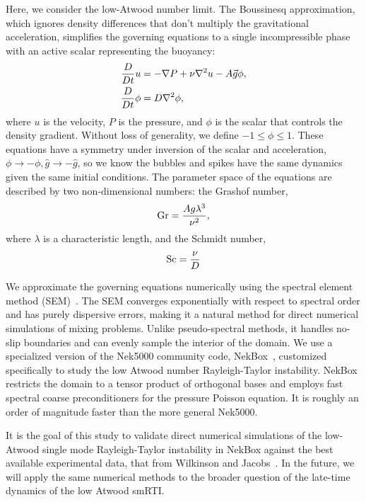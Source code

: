 Here, we consider the low-Atwood number limit.
The Boussinesq approximation, which ignores density differences that don't multiply the gravitational acceleration, simplifies the governing equations to a single incompressible phase with an active scalar representing the buoyancy:
\begin{align} \elabel{boussinesq}
\frac{D}{D t} u &= - \nabla P + \nu \nabla^2 u - A \vec{g} \phi, \\
\frac{D}{Dt} \phi &= D \nabla^2 \phi, \nonumber
\end{align}
where $u$ is the velocity,
$P$ is the pressure, and 
$\phi$ is the scalar that controls the density gradient.
Without loss of generality, we define $-1 \le \phi \le 1$.
These equations have a symmetry under inversion of the scalar and acceleration, $\phi \rightarrow -\phi, \hat{g} \rightarrow -\hat{g}$, so we know the bubbles and spikes have the same dynamics given the same initial conditions.
The parameter space of the equations are described by two non-dimensional numbers: the Grashof number,
\begin{equation} \elabel{grashof}
\text{Gr} = \frac{A g \lambda^3}{\nu^2},
\end{equation}
where $\lambda$ is a characteristic length, and
the Schmidt number,
\begin{equation} \elabel{schmidt}
\text{Sc} = \frac{\nu}{D}
\end{equation}

We approximate the governing equations numerically using the spectral element method (SEM)~\cite{Deville2002}.
The SEM converges exponentially with respect to spectral order and has purely dispersive errors, making it a natural method for direct numerical simulations of mixing problems.
Unlike pseudo-spectral methods, it handles no-slip boundaries and can evenly sample the interior of the domain.
We use a specialized version of the Nek5000 community code, NekBox~\cite{Hutchinsonb}, customized specifically to study the low Atwood number Rayleigh-Taylor instability.
NekBox restricts the domain to a tensor product of orthogonal bases and employs fast spectral coarse preconditioners for the pressure Poisson equation.
It is roughly an order of magnitude faster than the more general Nek5000.

It is the goal of this study to validate direct numerical simulations of the low-Atwood single mode Rayleigh-Taylor instability in NekBox against the best available experimental data, that from Wilkinson and Jacobs~\cite{Wilkinson2007}.
In the future, we will apply the same numerical methods to the broader question of the late-time dynamics of the low Atwood smRTI.

